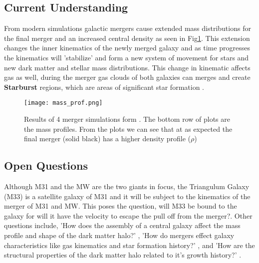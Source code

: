 \documentclass[fleqn,usenatbib]{mnras}
\begin{document}
\subsection{Current Understanding}
From modern simulations galactic mergers cause extended mass distributions for the final merger and an increased central density \citep[e.g.][]{Drakos2019bMNRAS} as seen in Fig\ref{fig:fig 1}.  This extension changes the inner kinematics of the newly merged galaxy and as time progresses the kinematics will 'stabilize' and form a new system of movement for stars and new dark matter and stellar mass distributions. This change in kinematic affects gas as well, during the merger gas clouds of both galaxies can merges and create \textbf{Starburst} regions, which are areas of significant star formation \citep[e.g.][]{Ejdetjärn2025}.
\begin{figure}
	\texttt{[image: mass\_prof.png]}
    \caption{Results of 4 merger simulations form \cite{Drakos2019aMNRAS}. The bottom row of plots are the mass profiles. From the plots we can see that at as expected the final merger (solid black) has a higher density profile ($\rho$)}
    \label{fig:fig 1}
\end{figure}
\subsection{Open Questions}
Although M31 and the MW are the two giants in focus, the Triangulum Galaxy (M33) is a satellite galaxy of M31 and it will be subject to the kinematics of the merger of M31 and MW. This poses the question, will M33 be bound to the galaxy for will it have the velocity to escape the pull off from the merger?. Other questions include, 'How does the assembly of a central galaxy affect the mass profile and shape of the dark matter halo?' \cite{Abadi2010MNRAS}, 'How do mergers effect galaxy characteristics like gas kinematics and star formation history?' \cite{Ejdetjärn2025}, and 'How are the structural properties of the dark matter halo related to it's growth history?' \cite{Drakos2019aMNRAS}.

\end{document}
